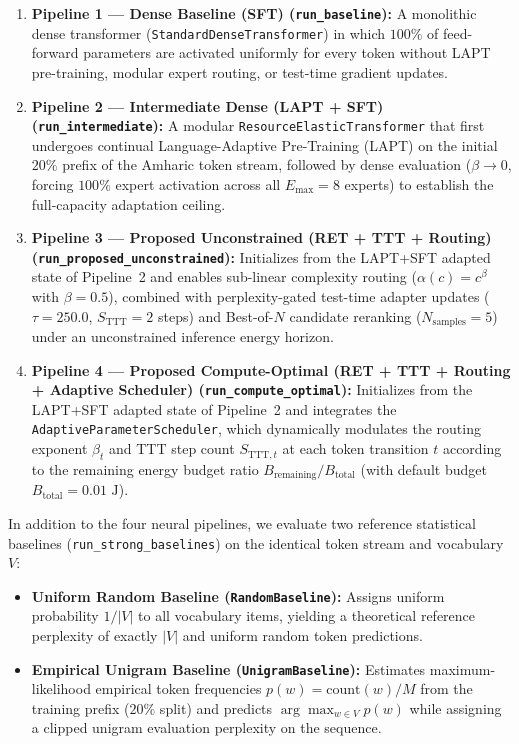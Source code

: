 \documentclass{interact}
\begin{document}
\begin{enumerate}
    \item \textbf{Pipeline 1 --- Dense Baseline (SFT) (\texttt{run\_baseline}):} A monolithic dense transformer (\texttt{StandardDenseTransformer}) in which $100\%$ of feed-forward parameters are activated uniformly for every token without LAPT pre-training, modular expert routing, or test-time gradient updates.
    \item \textbf{Pipeline 2 --- Intermediate Dense (LAPT + SFT) (\texttt{run\_intermediate}):} A modular \texttt{ResourceElasticTransformer} that first undergoes continual Language-Adaptive Pre-Training (LAPT) on the initial $20\%$ prefix of the Amharic token stream, followed by dense evaluation ($\beta \to 0$, forcing $100\%$ expert activation across all $E_{\max}=8$ experts) to establish the full-capacity adaptation ceiling.
    \item \textbf{Pipeline 3 --- Proposed Unconstrained (RET + TTT + Routing) (\texttt{run\_proposed\_unconstrained}):} Initializes from the LAPT+SFT adapted state of Pipeline~2 and enables sub-linear complexity routing ($\alpha(c) = c^{\beta}$ with $\beta = 0.5$), combined with perplexity-gated test-time adapter updates ($\tau = 250.0$, $S_{\text{TTT}} = 2$ steps) and Best-of-$N$ candidate reranking ($N_{\text{samples}} = 5$) under an unconstrained inference energy horizon.
    \item \textbf{Pipeline 4 --- Proposed Compute-Optimal (RET + TTT + Routing + Adaptive Scheduler) (\texttt{run\_compute\_optimal}):} Initializes from the LAPT+SFT adapted state of Pipeline~2 and integrates the \texttt{AdaptiveParameterScheduler}, which dynamically modulates the routing exponent $\beta_t$ and TTT step count $S_{\text{TTT},t}$ at each token transition $t$ according to the remaining energy budget ratio $B_{\text{remaining}} / B_{\text{total}}$ (with default budget $B_{\text{total}} = 0.01\text{ J}$).
\end{enumerate}

In addition to the four neural pipelines, we evaluate two reference statistical baselines (\texttt{run\_strong\_baselines}) on the identical token stream and vocabulary $V$:
\begin{itemize}
    \item \textbf{Uniform Random Baseline (\texttt{RandomBaseline}):} Assigns uniform probability $1/|V|$ to all vocabulary items, yielding a theoretical reference perplexity of exactly $|V|$ and uniform random token predictions.
    \item \textbf{Empirical Unigram Baseline (\texttt{UnigramBaseline}):} Estimates maximum-likelihood empirical token frequencies $p(w) = \text{count}(w)/M$ from the training prefix ($20\%$ split) and predicts $\arg\max_{w \in V} p(w)$ while assigning a clipped unigram evaluation perplexity on the sequence.
\end{itemize}
\end{document}
